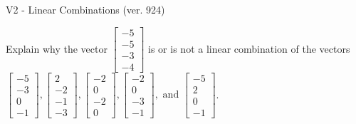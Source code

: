 \begin{exercise}
  \begin{exerciseTitle}V2 - Linear Combinations (ver. 924)\end{exerciseTitle}
  \begin{exerciseStatement}
    Explain why the vector \(\left[\begin{array}{c}
-5 \\
-5 \\
-3 \\
-4
\end{array}\right]\)  is or is not a linear 
	combination of the vectors \(\left[\begin{array}{c}
-5 \\
-3 \\
0 \\
-1
\end{array}\right] , \left[\begin{array}{c}
2 \\
-2 \\
-1 \\
-3
\end{array}\right] , \left[\begin{array}{c}
-2 \\
0 \\
-2 \\
0
\end{array}\right] , \left[\begin{array}{c}
-2 \\
0 \\
-3 \\
-1
\end{array}\right] , \text{ and } \left[\begin{array}{c}
-5 \\
2 \\
0 \\
-1
\end{array}\right]\).
	



\end{exerciseStatement}
\end{exercise}
